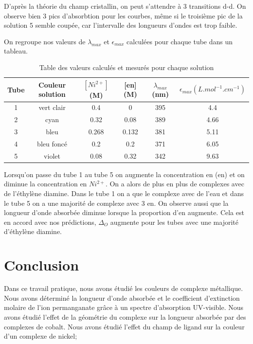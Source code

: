 \documentclass[12pt]{article}
\begin{document}
D'après la théorie du champ cristallin, on peut s'attendre à 3 transitions d-d. 
On observe bien 3 pics d'absorbtion pour les courbes, même si le troisième pic de la solution 5 semble coupée, car l'intervalle des longueurs d'ondes est trop faible.

On regroupe nos valeurs de $\lambda_{max}$ et $\epsilon_{max}$ calculées pour chaque tube dans un tableau.

\begin{table}[h!]
    \begin{center}
        \begin{tabular}[pos]{|c|c|c|c|c|c|}
            \hline
            Tube & Couleur solution & $[Ni^{2+}]$ (M) & [en] (M) & $\lambda_{max}$ (nm) & $\epsilon_{max} (L.mol^{-1}.cm^{-1})$ \\
            \hline
            1 &  vert clair & 0.4 & 0 & 395 & 4.4\\
            2 & cyan & 0.32 & 0.08 & 389 & 4.66\\
            3 & bleu & 0.268 & 0.132 & 381 & 5.11\\
            4 & bleu foncé & 0.2 & 0.2 & 371 & 6.05\\
            5 & violet & 0.08 & 0.32 & 342 & 9.63\\
            \hline  
        \end{tabular}
        \caption{Table des valeurs calculés et mesurés pour chaque solution}
            \label{table2:donne3partie}
    \end{center}
\end{table}

Lorsqu'on passe du tube 1 au tube 5 on augmente la concentration en (en) et on diminue la concentration en $Ni^{2+}$. 
On a alors de plus en plus de complexes avec de l'éthylène diamine.
Dans le tube 1 on a que le complexe avec de l'eau et dans le tube 5 on a une majorité de complexe avec 3 en. 
On observe aussi que la longueur d'onde absorbée diminue lorsque la proportion d'en augmente.
Cela est en accord avec nos prédictions, $\Delta_O$ augmente pour les tubes avec une majorité d'éthylène diamine.

\section*{Conclusion}

Dans ce travail pratique, nous avons étudié les couleurs de complexe métallique.
Nous avons déterminé la longueur d'onde absorbée et le coefficient d'extinction  molaire de l'ion permanganate grâce à un spectre d'absorption UV-visible.
Nous avons étudié l'effet de la géométrie du complexe sur la longueur absorbée par des complexes de cobalt.
Nous avons étudié l'effet du champ de ligand sur la couleur d'un complexe de nickel;  
\end{document}

